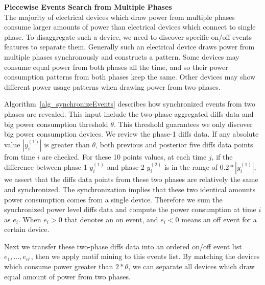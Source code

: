 \textbf{Piecewise Events Search from Multiple Phases} \\
The majority of electrical devices which draw power from multiple phases consume larger amounts of power than electrical devices which connect to single phase. 
To disaggregate such a device, we need to 
discover specific on/off events features to separate them. 
Generally such an electrical device draws power from multiple phases synchronously 
and constructs a  pattern. 
Some devices may consume equal power from both phases all the time,  and so their power consumption patterns from both phases keep the same.
Other devices may show different power usage patterns when drawing power from two phases. 

Algorithm~\ref{alg_synchronizeEvents} describes how synchronized events from two phases are revealed.  
This input include the two-phase aggregated diffs data and big power consumption threshold $\theta$. 
This threshold guarantees we only discover big power consumption devices. 
We review the phase-1 diffs data. 
If any absolute value $|y_i^{(1)}|$ is greater than $\theta$, 
both previous and posterior five diffs data points from time $i$ are checked. 
For these 10 points values, 
at each time $j$, if the difference between phase-1 $y_i^{(1)}$ and phase-2 $y_i^{(2)}$ is in the range of $0.2*|y_i^{(1)}|$,  
we assert that the diffs data points from these two phases are relatively the same and synchronized. 
The synchronization implies that 
these two identical amounts power consumption comes from a single device. 
Therefore we sum the synchronized power level diffs data and compute the power consumption at time $i$ as $e_i$.  
When $e_i>0$ that denotes an on event, and $e_i<0$ means an off event for a certain device.

Next we transfer these two-phase diffs data into 
an ordered on/off event list $e_1, ..., e_{n'}$,
then we apply motif mining to this events list. 
By matching the devices which consume power greater than $2*\theta$, 
we can separate all devices which draw equal amount of power from two phases.  

